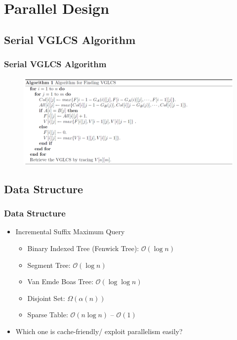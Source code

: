 \section{Parallel Design}

\subsection{Serial VGLCS Algorithm}
\begin{frame}
	\frametitle{Serial VGLCS Algorithm}
	\begin{figure}
		\includegraphics[scale=0.3]{figure/fig-VGLCS-algo.png}
	\end{figure}
\end{frame}

\subsection{Data Structure}
\begin{frame}
    \frametitle{Data Structure}
    \begin{itemize}
    \setlength\itemsep{1em}
    	\item Incremental Suffix Maximum Query
    		\begin{itemize}
    			\setlength\itemsep{1em}
    			\item Binary Indexed Tree (Fenwick Tree): $\mathcal{O}(\log n)$
    			\item Segment Tree: $\mathcal{O}(\log n)$
    			\item Van Emde Boas Tree: $\mathcal{O}(\log \log n)$
    			\item Disjoint Set: $\Omega(\alpha(n))$
    			\item Sparse Table: $\mathcal{O}(n \log n)$ -- $\mathcal{O}(1)$
    		\end{itemize}
    	\item Which one is cache-friendly/ exploit parallelism easily?
    \end{itemize}
\end{frame}

